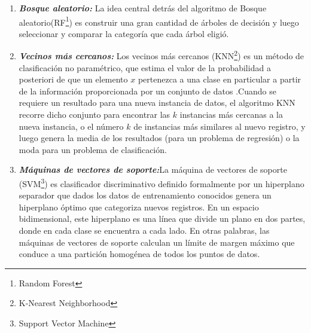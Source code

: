 \begin{enumerate}[label=\textbf{\arabic*})]
\begin{enumerate}[label=\textbf{(\alph*)}]
		\item \textit{\textbf{Bosque aleatorio:}}
		La idea central detrás del algoritmo de Bosque aleatorio(RF\footnote{Random Forest}) es construir una gran cantidad de árboles de decisión y luego seleccionar y comparar la categoría que cada árbol eligió\cite{Roman2019}. 
		
		\item \textit{\textbf{Vecinos más cercanos:}}
		Los vecinos más cercanos (KNN\footnote{K-Nearest Neighborhood}) es un método de clasificación no paramétrico, que estima el valor de la probabilidad a posteriori de que un elemento $x$ pertenezca a una clase en particular a partir de la información proporcionada por un conjunto de datos .Cuando se requiere un resultado para una nueva instancia de datos, el algoritmo KNN recorre dicho conjunto para encontrar las $k$ instancias más cercanas a la nueva instancia, o el número $k$ de instancias más similares al nuevo registro, y luego genera la media de los resultados (para un problema de regresión) o la moda para un problema de clasificación\cite{Shaw2019}.
		
		\item \textit{\textbf{Máquinas de vectores de soporte:}}La máquina de vectores de soporte (SVM\footnote{Support Vector Machine}) es clasificador discriminativo definido formalmente por un hiperplano separador que dados los datos de entrenamiento conocidos genera un hiperplano óptimo que categoriza nuevos registros. En un espacio bidimensional, este hiperplano es una línea que divide un plano en dos partes, donde en cada clase se encuentra a cada lado. En otras palabras, las máquinas de vectores de soporte calculan un límite de margen máximo que conduce a una partición homogénea de todos los puntos de datos\cite{Patel2017}. 
	\end{enumerate}
	
\end{enumerate}

\clearpage
